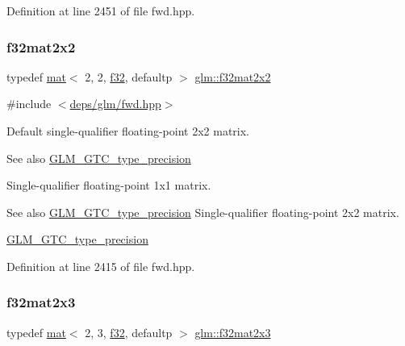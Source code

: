 Definition at line 2451 of file fwd.\+hpp.

\mbox{\label{group__gtc__type__precision_ga3c0ffd3a47ae47ff05d5ea6e90825caa}} 
\subsubsection{\texorpdfstring{f32mat2x2}{f32mat2x2}}
{\footnotesize\ttfamily typedef \hyperlink{structglm_1_1mat}{mat}$<$ 2, 2, \hyperlink{group__gtc__type__precision_ga0ec999b57f5330d9021256e96038df04}{f32}, defaultp $>$ \hyperlink{group__gtc__type__precision_ga3c0ffd3a47ae47ff05d5ea6e90825caa}{glm\+::f32mat2x2}}



{\ttfamily \#include $<$\hyperlink{fwd_8hpp}{deps/glm/fwd.\+hpp}$>$}

Default single-\/qualifier floating-\/point 2x2 matrix. \begin{DoxySeeAlso}{See also}
\hyperlink{group__gtc__type__precision}{G\+L\+M\+\_\+\+G\+T\+C\+\_\+type\+\_\+precision}
\end{DoxySeeAlso}
Single-\/qualifier floating-\/point 1x1 matrix. \begin{DoxySeeAlso}{See also}
\hyperlink{group__gtc__type__precision}{G\+L\+M\+\_\+\+G\+T\+C\+\_\+type\+\_\+precision} Single-\/qualifier floating-\/point 2x2 matrix. 

\hyperlink{group__gtc__type__precision}{G\+L\+M\+\_\+\+G\+T\+C\+\_\+type\+\_\+precision} 
\end{DoxySeeAlso}


Definition at line 2415 of file fwd.\+hpp.

\mbox{\label{group__gtc__type__precision_ga1f5a1129669d427f5fbc5f02ff52c366}} 
\subsubsection{\texorpdfstring{f32mat2x3}{f32mat2x3}}
{\footnotesize\ttfamily typedef \hyperlink{structglm_1_1mat}{mat}$<$ 2, 3, \hyperlink{group__gtc__type__precision_ga0ec999b57f5330d9021256e96038df04}{f32}, defaultp $>$ \hyperlink{group__gtc__type__precision_ga1f5a1129669d427f5fbc5f02ff52c366}{glm\+::f32mat2x3}}



